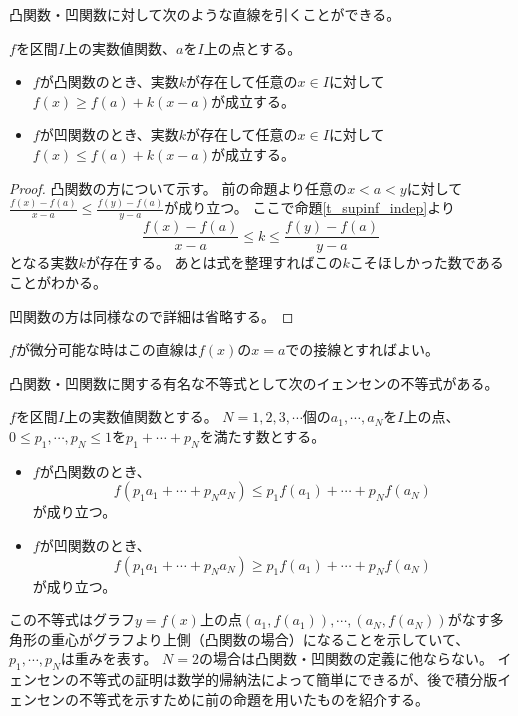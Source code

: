 凸関数・凹関数に対して次のような直線を引くことができる。

\begin{proposition}
\label{t_convex_supp}
$f$を区間$I$上の実数値関数、$a$を$I$上の点とする。
\begin{itemize}
\item
$f$が凸関数のとき、実数$k$が存在して任意の$x \in I$に対して$f(x) \ge f(a)+k(x-a)$が成立する。
\item
$f$が凹関数のとき、実数$k$が存在して任意の$x \in I$に対して$f(x) \le f(a)+k(x-a)$が成立する。
\end{itemize}
\end{proposition}

\begin{proof}
凸関数の方について示す。
前の命題より任意の$x < a < y$に対して$\frac{f(x)-f(a)}{x-a} \le \frac{f(y)-f(a)}{y-a}$が成り立つ。
ここで命題\ref{t_supinf_indep}より
$$
\frac{f(x)-f(a)}{x-a} \le k \le \frac{f(y)-f(a)}{y-a}
$$
となる実数$k$が存在する。
あとは式を整理すればこの$k$こそほしかった数であることがわかる。

凹関数の方は同様なので詳細は省略する。
\end{proof}

\begin{remark}
$f$が微分可能な時はこの直線は$f(x)$の$x = a$での接線とすればよい。
\end{remark}

凸関数・凹関数に関する有名な不等式として次のイェンセンの不等式がある。

\begin{theorem}[イェンセンの不等式]
$f$を区間$I$上の実数値関数とする。
$N = 1, 2, 3, \cdots$個の$a_1, \cdots, a_N$を$I$上の点、$0 \le p_1, \cdots, p_N \le 1$を$p_1+\cdots+p_N$を満たす数とする。
\begin{itemize}
\item
$f$が凸関数のとき、
$$
f(p_1 a_1+\cdots+p_N a_N) \le p_1 f(a_1)+\cdots+p_N f(a_N)
$$
が成り立つ。
\item
$f$が凹関数のとき、
$$
f(p_1 a_1+\cdots+p_N a_N) \ge p_1 f(a_1)+\cdots+p_N f(a_N)
$$
が成り立つ。
\end{itemize}
\end{theorem}

この不等式はグラフ$y = f(x)$上の点$(a_1, f(a_1)), \cdots, (a_N, f(a_N))$がなす多角形の重心がグラフより上側（凸関数の場合）になることを示していて、$p_1, \cdots, p_N$は重みを表す。
$N = 2$の場合は凸関数・凹関数の定義に他ならない。
イェンセンの不等式の証明は数学的帰納法によって簡単にできるが、後で積分版イェンセンの不等式を示すために前の命題を用いたものを紹介する。

